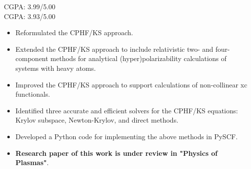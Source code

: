 \documentclass[10pt,a4paper]{altacv}
\begin{document}

\begin{fullwidth}
\makecvheader
\end{fullwidth}


\textsc{CGPA}: 3.99/5.00
\\
\textsc{CGPA}: 3.93/5.00


\begin{itemize}
\item Reformulated the CPHF/KS approach.
\item Extended the CPHF/KS approach to include relativistic two- and four-component methods for analytical (hyper)polarizability calculations of systems with heavy atoms.
\item Improved the CPHF/KS approach to support calculations of non-collinear xc functionals.
\item Identified three accurate and efficient solvers for the CPHF/KS equations: Krylov subspace, Newton-Krylov, and direct methods.
\item Developed a Python code for implementing the above methods in PySCF.
\item \textbf{Research paper of this work is under review in "Physics of Plasmas"}.
\end{itemize}
\end{document}
